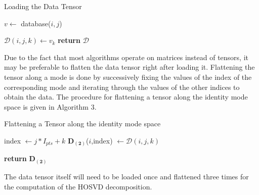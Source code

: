 \documentclass[11pt,a4paper,twoside]{report}
\begin{document}
\begin{algorithm}\label{a:load}
\caption{Loading the Data Tensor}
\begin{algorithmic}[1]
 

\State $v \gets $ database($i,j$)


\State $\mathcal{D}(i,j,k) \gets v_k $
\EndFor
\EndFor
\EndFor
\State \textbf{return} $\mathcal{D}$ 
\EndProcedure
\end{algorithmic}
\end{algorithm}

Due to the fact that most algorithms operate on matrices instead of tensors, it
may be preferable to flatten the data tensor right after loading it. Flattening
the tensor along a mode is done by successively fixing the values of the index of
the corresponding mode and iterating through the values of the other indices to
obtain the data. The procedure for flattening a tensor along the identity mode
space is given in Algorithm 3.

\begin{algorithm}
\caption{Flattening a Tensor along the identity mode space}
\begin{algorithmic}[1]
 


\State index $\gets j*I_{pts} + k$
\State $\mathbf{D_{(2)}}$($i$,index) $\gets \mathcal{D}(i,j,k)$

\EndFor
\EndFor
\EndFor
\State \textbf{return} $\mathbf{D_{(2)}}$ 
\EndProcedure
\end{algorithmic}
\end{algorithm}

The data tensor itself will need to be loaded once and flattened three times for
the computation of the HOSVD decomposition.
\end{document}
